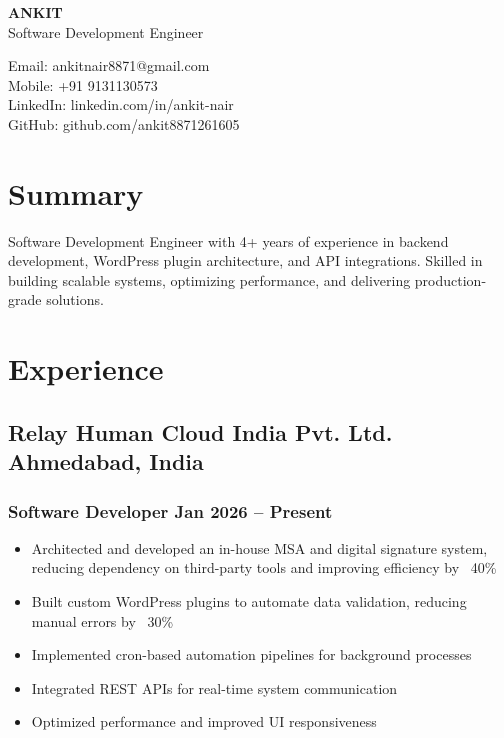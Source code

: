 \documentclass[11pt]{article}
\begin{document}
\begin{center}
	\begin{minipage}{0.5\textwidth}
		{\Huge\bfseries ANKIT} \\ \medskip
		Software Development Engineer
	\end{minipage} \hfill
	\begin{minipage}{0.45\textwidth}
		\raggedleft
		Email: ankitnair8871@gmail.com \\
		Mobile: +91 9131130573 \\
		LinkedIn: linkedin.com/in/ankit-nair \\
		GitHub: github.com/ankit8871261605
	\end{minipage}
\end{center}

\section{Summary}
Software Development Engineer with 4+ years of experience in backend development, WordPress plugin architecture, and API integrations. Skilled in building scalable systems, optimizing performance, and delivering production-grade solutions.

\section{Experience}

\subsection{Relay Human Cloud India Pvt. Ltd. \hfill Ahmedabad, India}
\subsubsection{Software Developer \hfill Jan 2026 -- Present}
\begin{itemize}
\item Architected and developed an in-house MSA and digital signature system, reducing dependency on third-party tools and improving efficiency by ~40\%
\item Built custom WordPress plugins to automate data validation, reducing manual errors by ~30\%
\item Implemented cron-based automation pipelines for background processes
\item Integrated REST APIs for real-time system communication
\item Optimized performance and improved UI responsiveness
\end{itemize}
\end{document}
